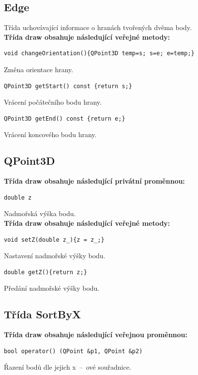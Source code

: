 \documentclass[a4paper, 12pt, oneside, titlepage]{article} %
\begin{document}
\subsection{Edge}
Třída uchovávající informace o hranách tvořených dvěma body.\\
\textbf{Třída draw obsahuje následující veřejné metody:}
\begin{verbatim}
void changeOrientation(){QPoint3D temp=s; s=e; e=temp;}
\end{verbatim}
Změna orientace hrany.\\

\begin{verbatim}
QPoint3D getStart() const {return s;}
\end{verbatim}
Vrácení počátečního bodu hrany.\\

\begin{verbatim}
QPoint3D getEnd() const {return e;}
\end{verbatim}
Vrácení koncového bodu hrany.\\

\subsection{QPoint3D}
\textbf{Třída draw obsahuje následující privátní proměnnou:}
\begin{verbatim}
double z
\end{verbatim}
Nadmořská výška bodu.\\

\textbf{Třída draw obsahuje následující veřejné metody:}
\begin{verbatim}
void setZ(double z_){z = z_;}
\end{verbatim}
Nastavení nadmořské výšky bodu.\\

\begin{verbatim}
double getZ(){return z;}
\end{verbatim}
Předání nadmořské výšky bodu.\\

\subsection{Třída SortByX}
\textbf{Třída draw obsahuje následující veřejnou proměnnou:}
\begin{verbatim}
bool operator() (QPoint &p1, QPoint &p2)
\end{verbatim}
Řazení bodů dle jejich x~--~ové souřadnice.\\
\end{document}
